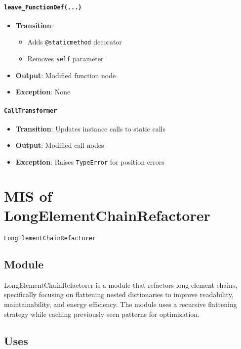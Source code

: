 \documentclass[12pt, titlepage]{article}
\begin{document}
\paragraph{\texttt{leave\_FunctionDef(...)}}
\begin{itemize}
\item \textbf{Transition}:
\begin{itemize}
\item Adds \texttt{@staticmethod} decorator
\item Removes \texttt{self} parameter
\end{itemize}
\item \textbf{Output}: Modified function node
\item \textbf{Exception}: None
\end{itemize}

\paragraph{\texttt{CallTransformer}}
\begin{itemize}
\item \textbf{Transition}: Updates instance calls to static calls
\item \textbf{Output}: Modified call nodes
\item \textbf{Exception}: Raises \texttt{TypeError} for position errors
\end{itemize}

\newpage  


\section{MIS of LongElementChainRefactorer} \label{mis:lec}

\texttt{LongElementChainRefactorer}

\subsection{Module}

LongElementChainRefactorer is a module that refactors long element chains, specifically focusing on flattening nested dictionaries to improve readability, maintainability, and energy efficiency. The module uses a recursive flattening strategy while caching previously seen patterns for optimization.

\subsection{Uses}
\end{document}
